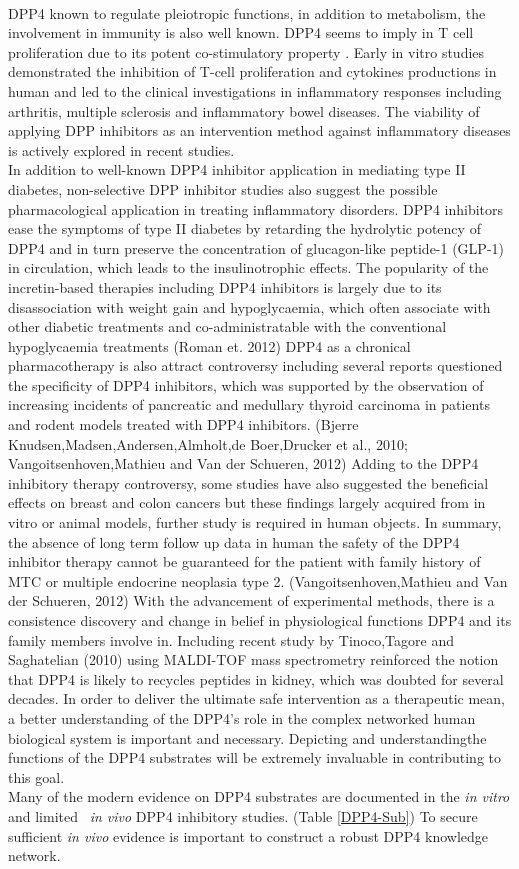 \\
DPP4 known to regulate pleiotropic functions, in addition to metabolism, the involvement in immunity is also well known. DPP4 seems to imply in T cell proliferation due to its potent co-stimulatory property \cite{Mentlein_1999}. Early in vitro studies demonstrated the inhibition of T-cell proliferation and cytokines productions in human and led to the clinical investigations in inflammatory responses including arthritis, multiple sclerosis and inflammatory bowel diseases. The viability of applying DPP inhibitors as an intervention method against inflammatory diseases is actively explored in recent studies. 
\\
In addition to well-known DPP4 inhibitor application in mediating type II diabetes, non-selective DPP inhibitor studies also suggest the possible pharmacological application in treating inflammatory disorders. DPP4 inhibitors ease the symptoms of type II diabetes by retarding the hydrolytic potency of DPP4 and in turn preserve the concentration of glucagon-like peptide-1 (GLP-1) in circulation, which leads to the insulinotrophic effects. \cite{Ahren:2009kx} The popularity of the incretin-based therapies including DPP4 inhibitors is largely due to its disassociation with weight gain and hypoglycaemia, which often associate with other diabetic treatments and co-administratable with the conventional hypoglycaemia treatments (Roman et. 2012) DPP4 as a chronical pharmacotherapy is also attract controversy including several reports questioned the specificity of DPP4 inhibitors, which was supported by the observation of increasing incidents of pancreatic and medullary thyroid carcinoma in patients and rodent models treated with DPP4 inhibitors. (Bjerre Knudsen,Madsen,Andersen,Almholt,de Boer,Drucker et al., 2010; Vangoitsenhoven,Mathieu and Van der Schueren, 2012) Adding to the DPP4 inhibitory therapy controversy, some studies have also suggested the beneficial effects on breast and colon cancers but these findings largely acquired from in vitro or animal models, further study is required in human objects. In summary, the absence of long term follow up data in human the safety of the DPP4 inhibitor therapy cannot be guaranteed for the patient with family history of MTC or multiple endocrine neoplasia type 2. (Vangoitsenhoven,Mathieu and Van der Schueren, 2012)
With the advancement of experimental methods, there is a consistence discovery and change in belief in physiological functions DPP4 and its family members involve in. Including recent study by Tinoco,Tagore and Saghatelian (2010) using MALDI-TOF mass spectrometry reinforced the notion that DPP4 is likely to recycles peptides in kidney, which was doubted for several decades. In order to deliver the ultimate safe intervention as a therapeutic mean, a better understanding of the DPP4’s role in the complex networked human biological system is important and necessary. Depicting and understandingthe functions of the DPP4 substrates will be extremely invaluable in contributing to this goal. 
\\
Many of the modern evidence on DPP4 substrates are documented in the \textit{in vitro} and limited ~\textit{in vivo} DPP4 inhibitory studies. (Table \ref{DPP4-Sub}) To secure sufficient \textit{in vivo} evidence is important to construct a robust DPP4 knowledge network. 
\\